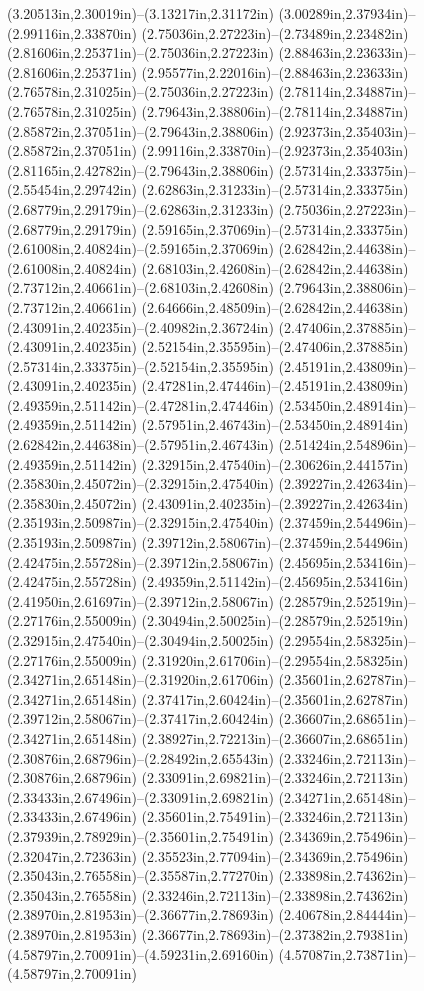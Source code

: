 (3.20513in,2.30019in)--(3.13217in,2.31172in) (3.00289in,2.37934in)--(2.99116in,2.33870in) (2.75036in,2.27223in)--(2.73489in,2.23482in) (2.81606in,2.25371in)--(2.75036in,2.27223in) (2.88463in,2.23633in)--(2.81606in,2.25371in) (2.95577in,2.22016in)--(2.88463in,2.23633in) (2.76578in,2.31025in)--(2.75036in,2.27223in) (2.78114in,2.34887in)--(2.76578in,2.31025in) (2.79643in,2.38806in)--(2.78114in,2.34887in) (2.85872in,2.37051in)--(2.79643in,2.38806in) (2.92373in,2.35403in)--(2.85872in,2.37051in) (2.99116in,2.33870in)--(2.92373in,2.35403in) (2.81165in,2.42782in)--(2.79643in,2.38806in) (2.57314in,2.33375in)--(2.55454in,2.29742in) (2.62863in,2.31233in)--(2.57314in,2.33375in) (2.68779in,2.29179in)--(2.62863in,2.31233in) (2.75036in,2.27223in)--(2.68779in,2.29179in) (2.59165in,2.37069in)--(2.57314in,2.33375in) (2.61008in,2.40824in)--(2.59165in,2.37069in) (2.62842in,2.44638in)--(2.61008in,2.40824in) (2.68103in,2.42608in)--(2.62842in,2.44638in) (2.73712in,2.40661in)--(2.68103in,2.42608in) (2.79643in,2.38806in)--(2.73712in,2.40661in) (2.64666in,2.48509in)--(2.62842in,2.44638in) (2.43091in,2.40235in)--(2.40982in,2.36724in) (2.47406in,2.37885in)--(2.43091in,2.40235in) (2.52154in,2.35595in)--(2.47406in,2.37885in) (2.57314in,2.33375in)--(2.52154in,2.35595in) (2.45191in,2.43809in)--(2.43091in,2.40235in) (2.47281in,2.47446in)--(2.45191in,2.43809in) (2.49359in,2.51142in)--(2.47281in,2.47446in) (2.53450in,2.48914in)--(2.49359in,2.51142in) (2.57951in,2.46743in)--(2.53450in,2.48914in) (2.62842in,2.44638in)--(2.57951in,2.46743in) (2.51424in,2.54896in)--(2.49359in,2.51142in) (2.32915in,2.47540in)--(2.30626in,2.44157in) (2.35830in,2.45072in)--(2.32915in,2.47540in) (2.39227in,2.42634in)--(2.35830in,2.45072in) (2.43091in,2.40235in)--(2.39227in,2.42634in) (2.35193in,2.50987in)--(2.32915in,2.47540in) (2.37459in,2.54496in)--(2.35193in,2.50987in) (2.39712in,2.58067in)--(2.37459in,2.54496in) (2.42475in,2.55728in)--(2.39712in,2.58067in) (2.45695in,2.53416in)--(2.42475in,2.55728in) (2.49359in,2.51142in)--(2.45695in,2.53416in) (2.41950in,2.61697in)--(2.39712in,2.58067in) (2.28579in,2.52519in)--(2.27176in,2.55009in) (2.30494in,2.50025in)--(2.28579in,2.52519in) (2.32915in,2.47540in)--(2.30494in,2.50025in) (2.29554in,2.58325in)--(2.27176in,2.55009in) (2.31920in,2.61706in)--(2.29554in,2.58325in) (2.34271in,2.65148in)--(2.31920in,2.61706in) (2.35601in,2.62787in)--(2.34271in,2.65148in) (2.37417in,2.60424in)--(2.35601in,2.62787in) (2.39712in,2.58067in)--(2.37417in,2.60424in) (2.36607in,2.68651in)--(2.34271in,2.65148in) (2.38927in,2.72213in)--(2.36607in,2.68651in) (2.30876in,2.68796in)--(2.28492in,2.65543in) (2.33246in,2.72113in)--(2.30876in,2.68796in) (2.33091in,2.69821in)--(2.33246in,2.72113in) (2.33433in,2.67496in)--(2.33091in,2.69821in) (2.34271in,2.65148in)--(2.33433in,2.67496in) (2.35601in,2.75491in)--(2.33246in,2.72113in) (2.37939in,2.78929in)--(2.35601in,2.75491in) (2.34369in,2.75496in)--(2.32047in,2.72363in) (2.35523in,2.77094in)--(2.34369in,2.75496in) (2.35043in,2.76558in)--(2.35587in,2.77270in) (2.33898in,2.74362in)--(2.35043in,2.76558in) (2.33246in,2.72113in)--(2.33898in,2.74362in) (2.38970in,2.81953in)--(2.36677in,2.78693in) (2.40678in,2.84444in)--(2.38970in,2.81953in) (2.36677in,2.78693in)--(2.37382in,2.79381in) (4.58797in,2.70091in)--(4.59231in,2.69160in) (4.57087in,2.73871in)--(4.58797in,2.70091in) 